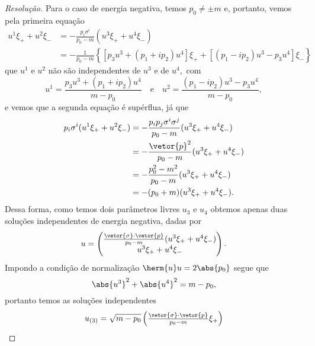 \begin{proof}[Resolução]
    Para o caso de energia negativa, temos \(p_0 \neq \pm m\)  e, portanto, vemos pela primeira equação
    \begin{align*}
        u^1 \xi_+ + u^2 \xi_- &= -\frac{p_i\sigma^i}{p_0 - m} (u^3 \xi_+ + u^4 \xi_-)\\
                              &= -\frac{1}{p_0 - m} \left\{\left[p_3 u^3 + (p_1 + i p_2)u^4\right]\xi_+ + \left[(p_1 - i p_2) u^3 - p_3 u^4\right]\xi_-\right\}
    \end{align*}
    que \(u^1\) e \(u^2\) não são independentes de \(u^3\) e de \(u^4,\) com
    \begin{equation*}
        u^1 = \frac{p_3 u^3 + (p_1 + i p_2) u^4}{m - p_0}
        \quad\text{e}\quad
        u^2 = \frac{(p_1 - ip_2) u^3 - p_3 u^4}{m - p_0},
    \end{equation*}
    e vemos que a segunda equação é supérflua, já que
    \begin{align*}
        p_i \sigma^i (u^1 \xi_+ + u^2 \xi_-) &= - \frac{p_i p_j \sigma^i \sigma^j}{p_0 - m} (u^3 \xi_+ + u^4 \xi_-)\\
                                             &= -\frac{\vetor{p}^2}{p_0 - m} (u^3 \xi_+ + u^4 \xi_-)\\
                                             &= - \frac{p_0^2 - m^2}{p_0 - m} (u^3 \xi_+ + u^4 \xi_-)\\
                                             &= - (p_0 + m) (u^3 \xi_+ + u^4 \xi_-).
    \end{align*}
    Dessa forma, como temos dois parâmetros livres \(u_3\) e \(u_4\) obtemos apenas duas soluções independentes de energia negativa, dadas por
    \begin{equation*}
        u = \begin{pmatrix}
            \frac{\vetor{\sigma}\cdot\vetor{p}}{p_0 - m} (u^3\xi_+ + u^4 \xi_-)\\
            u^3\xi_+ + u^4 \xi_-
        \end{pmatrix}.
    \end{equation*}
    Impondo a condição de normalização \(\herm{u} u = 2 \abs{p_0}\) segue que
    \begin{equation*}
        \abs{u^3}^2 + \abs{u^4}^2 = m - p_0,
    \end{equation*}
    portanto temos as soluções independentes
    \begin{equation*}
        u_{(3)} = \sqrt{m - p_0}\begin{pmatrix}
            \frac{\vetor{\sigma}\cdot\vetor{p}}{p_0 - m} \xi_+\\

\end{pmatrix}
\end{equation*}
\end{proof}
